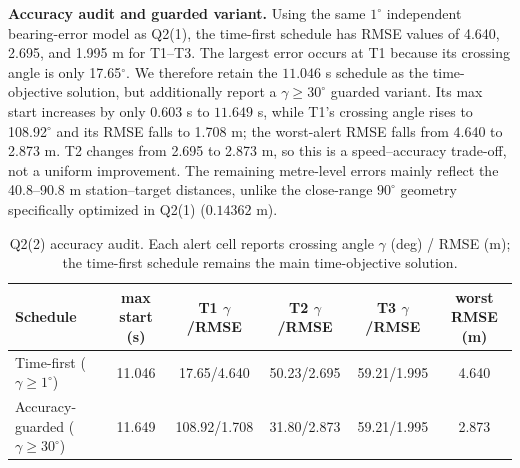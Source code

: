 \textbf{Accuracy audit and guarded variant.} Using the same $1^\circ$ independent
bearing-error model as Q2(1), the time-first schedule has RMSE values of
4.640, 2.695, and 1.995 m for T1--T3.
The largest error occurs at T1 because its crossing angle is only
17.65$^\circ$. We therefore retain the
$11.046$ s schedule as the time-objective solution, but additionally report a
$\gamma\ge30^\circ$ guarded variant. Its max start increases by only
0.603 s to $11.649$ s, while T1's crossing angle rises to
108.92$^\circ$ and its RMSE falls to
1.708 m; the worst-alert RMSE falls from
4.640 to 2.873 m.
T2 changes from 2.695 to 2.873 m, so this is a
speed--accuracy trade-off, not a uniform improvement. The remaining metre-level errors
mainly reflect the 40.8--90.8 m station--target distances,
unlike the close-range $90^\circ$ geometry specifically optimized in Q2(1)
($0.14362$ m).

\begin{table}[!htb]\centering\footnotesize\setlength{\tabcolsep}{3.5pt}
\caption{Q2(2) accuracy audit. Each alert cell reports crossing angle $\gamma$ (deg) /
RMSE (m); the time-first schedule remains the main time-objective solution.}
\label{tab:q22accuracy}
\begin{tabular}{lccccc}
\toprule
Schedule & max start (s) & T1 $\gamma$/RMSE & T2 $\gamma$/RMSE & T3 $\gamma$/RMSE & worst RMSE (m) \\
\midrule
Time-first ($\gamma\ge1^\circ$) & 11.046 &
17.65/4.640 &
50.23/2.695 &
59.21/1.995 & 4.640 \\
Accuracy-guarded ($\gamma\ge30^\circ$) & 11.649 &
108.92/1.708 &
31.80/2.873 &
59.21/1.995 & 2.873 \\
\bottomrule
\end{tabular}
\end{table}
